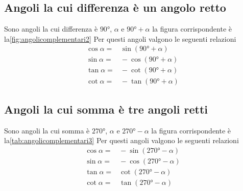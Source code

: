 \subsection{Angoli la cui differenza è un angolo retto}
Sono angoli la cui differenza è $\ang{90}$, $\alpha$ e $\ang{90}+\alpha$ la figura corrispondente è la\nobs\vref{fig:angolicomplementari2}
%	
Per questi angoli valgono le seguenti relazioni
\begin{align*}
\cos\alpha=&{}\sin(\ang{90}+\alpha)\\
\sin\alpha=&{}-\cos(\ang{90}+\alpha)\\
\tan\alpha=&{}-\cot(\ang{90}+\alpha)\\
\cot\alpha=&{}-\tan(\ang{90}+\alpha)
\end{align*}
\subsection{Angoli la cui somma è tre angoli retti}
Sono angoli la cui somma è $\ang{270}$, $\alpha$ e $\ang{270}-\alpha$ la figura corrispondente è la\nobs\vref{tab:angolicomplementari3}
%		
Per questi angoli valgono le seguenti relazioni
\begin{align*}
\cos\alpha=&{}-\sin(\ang{270}-\alpha)\\
\sin\alpha=&{}-\cos(\ang{270}-\alpha)\\
\tan\alpha=&{}\cot(\ang{270}-\alpha)\\
\cot\alpha=&{}\tan(\ang{270}-\alpha)
\end{align*}
